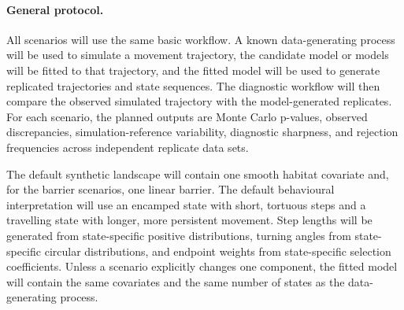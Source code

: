 \documentclass[11pt]{article}
\begin{document}
\paragraph{General protocol.}
All scenarios will use the same basic workflow. A known data-generating process
will be used to simulate a movement trajectory, the candidate model or models
will be fitted to that trajectory, and the fitted model will be used to
generate replicated trajectories and state sequences. The diagnostic workflow
will then compare the observed simulated trajectory with the model-generated
replicates. For each scenario, the planned outputs are Monte Carlo p-values,
observed discrepancies, simulation-reference variability, diagnostic sharpness,
and rejection frequencies across independent replicate data sets.

The default synthetic landscape will contain one smooth habitat covariate and,
for the barrier scenarios, one linear barrier. The default behavioural
interpretation will use an encamped state with short, tortuous steps and a
travelling state with longer, more persistent movement. Step lengths will be
generated from state-specific positive distributions, turning angles from
state-specific circular distributions, and endpoint weights from
state-specific selection coefficients. Unless a scenario explicitly changes
one component, the fitted model will contain the same covariates and the same
number of states as the data-generating process.
\end{document}
